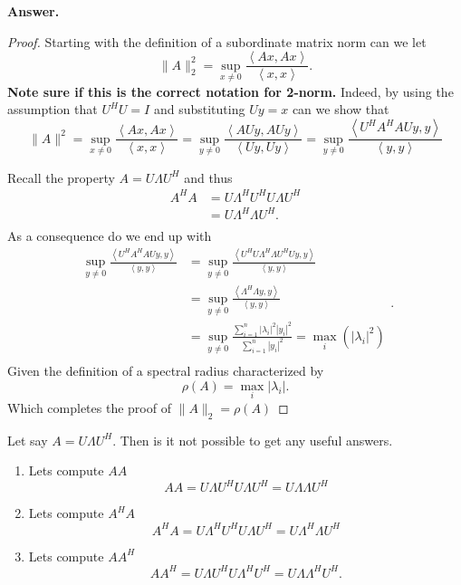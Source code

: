 \documentclass{article}
\theoremstyle{remark}
\newcommand{\newpara}
  {
  \vskip 0.4cm
  }
\begin{document}
\begin{tcolorbox}
  \textbf{Answer.} 
\begin{proof}
  Starting with the definition of a subordinate matrix norm \cite{sul} can we let \[
  \|A\|_{2}^{2} = \sup_{x \neq 0} \frac{\left<Ax, Ax \right>}{ \left<x,x \right>} .
  \] 
  \textbf{Note sure if this is the correct notation for 2-norm.} 
   Indeed, by using the assumption that $U^{H} U = I$ and substituting $Uy =  x$ can we show that \[
    \|A\|_{}^{2} = \sup_{x \neq 0} \frac{\left<Ax, Ax \right>}{\left<x,x \right>}  = \sup_{y\neq 0}  \frac{\left<AU y, A U y \right>}{ \left<U y, Uy \right>} = \sup_{y \neq 0} \frac{\left<U^{H} A^{H} A U y,y \right>}{\left<y,y \right>} 
  \] 
  \newpara
  Recall the property $A = U \Lambda  U^{H}$ and thus
  \[
    \begin{split}
  A^{H} A   & = U \Lambda ^{H} U^{H} U \Lambda U^{H}  \\
   & = U \Lambda ^{H} \Lambda U^{H}.   \\
    \end{split} 
  \] 
  As a consequence do we end up with \[
    \begin{split}
  \sup_{y \neq 0} \frac{\left<U^{H} A^{H} A U y, y  \right>}{\left<y,y \right>}   & = \sup_{y\neq 0}  \frac{\left<U^{H} U \Lambda ^{H} \Lambda  U^{H} U  y, y\right>}{ \left<y,y \right>}  \\
  &=  \sup_{y \neq 0} \frac{\left<\Lambda ^{H} \Lambda  y, y \right>}{\left<y,y \right>}  \\  
  &=   \sup_{ y \neq 0}  \frac{\sum_{i=1}^{n}  \left\lvert \lambda _{i} \right\rvert ^2  \left| y_{i} \right|^2}{ \sum_{i=1}^{n}  \left| y_{i} \right|^2}  = \max _{i} \left( \left\lvert \lambda_{i}  \right\rvert ^{2}  \right)  \\
    \end{split} .
  \] 
  Given the definition of a spectral radius \cite{quart} characterized by \[
  \rho \left( A \right) = \max_{i} \left\lvert \lambda_{i}  \right\rvert    .
  \] 
  Which completes the proof of $ \|A\|_{2} = \rho \left( A \right)$
   
\end{proof}
\end{tcolorbox}

Let say $A = U\Lambda U^{H}$. Then is it not possible to get any useful answers. 
    \begin{enumerate}[label=(\roman*)]
      \item Lets compute $AA$ \[
      A A = U \Lambda U^{H} U \Lambda  U^{H} = U \Lambda  \Lambda  U ^{H}
      \] 
    \item Lets compute $A^{H} A$ 
      \[
      A^{H} A = U \Lambda ^{H} U^{H} U \Lambda U^{H} = U \Lambda ^{H} \Lambda U^{H}
      \] 
    \item Lets compute  $A A^{H}$ \[
    A A^{H} = U \Lambda U^{H}  U \Lambda ^{H} U^{H}  = U \Lambda  \Lambda ^{H} U^{H}.
    \] 
    \end{enumerate}
\end{document}
